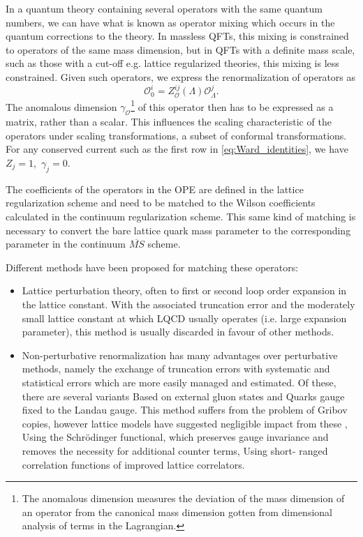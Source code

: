 \documentclass[a4paper,10pt]{book}
\begin{document}
In a quantum theory containing several operators with the same quantum numbers, we can have what is known as operator mixing which occurs in the quantum corrections to the theory. In massless QFTs, this mixing is constrained to operators of the same mass dimension, but in QFTs with a definite mass scale, such as those with a cut-off e.g. lattice regularized theories, this mixing is less constrained. Given such operators, we express the renormalization of operators as
\begin{equation}
\mathcal{O}_{0}^{i}=Z_{\mathcal{O}}^{i j}(\Lambda) \mathcal{O}_{\Lambda}^{j}.
\end{equation}
The anomalous dimension $\gamma_\mathcal{O}$\footnote{The anomalous dimension measures the deviation of the mass dimension of an operator from the canonical mass dimension gotten from dimensional analysis of terms in the Lagrangian.} of this operator then has to be expressed as a matrix, rather than a scalar. This influences the scaling characteristic of the operators under scaling transformations, a subset of conformal transformations. For any conserved current such as the first row in \eqref{eq:Ward_identities}, we have $Z_{j} = 1, \,\, \gamma_j=0$.

 The coefficients of the operators in the OPE are defined in the lattice regularization scheme and need to be matched to the Wilson coefficients calculated in the continuum regularization scheme. This same kind of matching is necessary to convert the bare lattice quark mass parameter to the corresponding parameter in the continuum $\overline{MS}$ scheme.

Different methods have been proposed for matching these operators:
\begin{itemize}
\item Lattice perturbation theory, often to first or second loop order expansion in the lattice constant. With the associated truncation error and the moderately small lattice constant at which LQCD usually operates (i.e. large expansion parameter), this method is usually discarded in favour of other methods.
\item Non-perturbative renormalization has many advantages over perturbative methods, namely the exchange of truncation errors with systematic and statistical errors which are more easily managed and estimated. Of these, there are several variants
\subitem Based on external gluon states and Quarks gauge fixed to the Landau gauge\cite{Martinelli_1995}. This method suffers from the problem of Gribov copies, however lattice models have suggested negligible impact from these \cite{giusti2001problems},
\subitem Using the Schrödinger functional, which preserves gauge invariance and removes the necessity for additional counter terms\cite{L_scher_1992},
\subitem Using short- ranged correlation functions of improved lattice correlators\cite{MARTINELLI1997141}.
\end{itemize}
\end{document}

